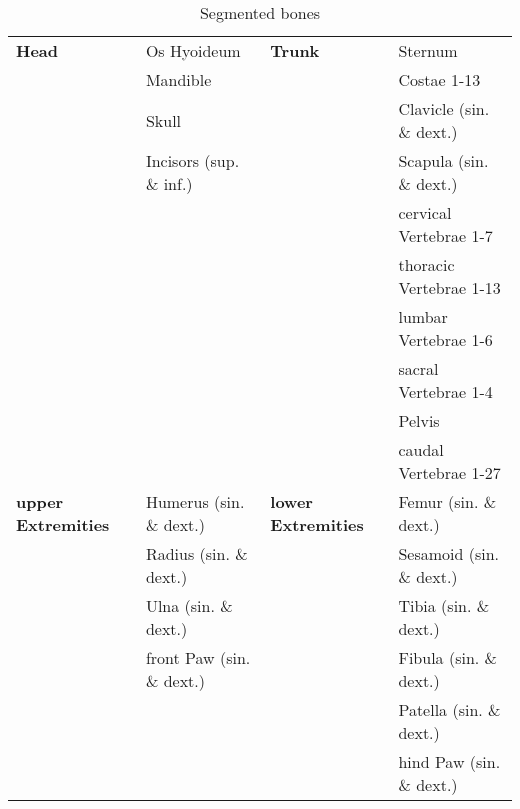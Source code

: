 \begin{table}
	\centering
	\begin{tabular}{l l l l}
		\hline
		\textbf{Head}              & Os Hyoideum               & \textbf{Trunk}             & Sternum                   \\
		                           & Mandible                  &                            & Costae 1-13               \\
		                           & Skull                     &                            & Clavicle  (sin. \& dext.) \\
		                           & Incisors (sup. \& inf.)   &                            & Scapula  (sin. \& dext.)  \\
		                           &                           &                            & cervical Vertebrae 1-7    \\
		                           &                           &                            & thoracic Vertebrae 1-13   \\
		                           &                           &                            & lumbar Vertebrae 1-6      \\
		                           &                           &                            & sacral Vertebrae 1-4      \\
		                           &                           &                            & Pelvis                    \\
		                           &                           &                            & caudal Vertebrae 1-27     \\
		\hline
		\textbf{upper Extremities} & Humerus (sin. \& dext.)   & \textbf{lower Extremities} & Femur (sin. \& dext.)     \\
		                           & Radius (sin. \& dext.)    &                            & Sesamoid (sin. \& dext.)  \\
		                           & Ulna (sin. \& dext.)      &                            & Tibia (sin. \& dext.)     \\
		                           & front Paw (sin. \& dext.) &                            & Fibula (sin. \& dext.)    \\
		                           &                           &                            & Patella (sin. \& dext.)   \\
		                           &                           &                            & hind Paw (sin. \& dext.)  \\
		\hline
	\end{tabular}\caption{Segmented bones}\label{tab:bones}
\end{table}


